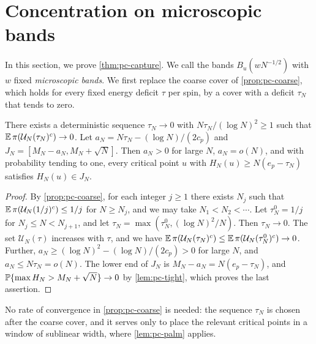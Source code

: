 \section{Concentration on microscopic bands}\label{sec:pc-capture}

In this section, we prove \cref{thm:pc-capture}. We call the bands $B_u(wN^{-1/2})$ with $w$ fixed \emph{microscopic bands}. We first replace the coarse cover of \cref{prop:pc-coarse}, which holds for every fixed energy deficit $\tau$ per spin, by a cover with a deficit $\tau_N$ that tends to zero.

\begin{lemma}\label{lem:pc-diagonal}
There exists a deterministic sequence $\tau_N\to0$ with $N\tau_N/(\log N)^2\ge1$ such that $\mathbb E\,\pi(\mathcal U_N(\tau_N)^c)\to0$. Let $a_N=N\tau_N-(\log N)/(2c_p)$ and $J_N=[M_N-a_N,M_N+\sqrt N]$. Then $a_N>0$ for large $N$, $a_N=o(N)$, and with probability tending to one, every critical point $u$ with $H_N(u)\ge N(e_p-\tau_N)$ satisfies $H_N(u)\in J_N$.
\end{lemma}

\begin{proof}
By \cref{prop:pc-coarse}, for each integer $j\ge1$ there exists $N_j$ such that $\mathbb E\,\pi(\mathcal U_N(1/j)^c)\le1/j$ for $N\ge N_j$, and we may take $N_1<N_2<\cdots$. Let $\tau^0_N=1/j$ for $N_j\le N<N_{j+1}$, and let $\tau_N=\max(\tau^0_N,(\log N)^2/N)$. Then $\tau_N\to0$. The set $\mathcal U_N(\tau)$ increases with $\tau$, and we have $\mathbb E\,\pi(\mathcal U_N(\tau_N)^c)\le\mathbb E\,\pi(\mathcal U_N(\tau^0_N)^c)\to0$. Further, $a_N\ge(\log N)^2-(\log N)/(2c_p)>0$ for large $N$, and $a_N\le N\tau_N=o(N)$. The lower end of $J_N$ is $M_N-a_N=N(e_p-\tau_N)$, and $\mathbb P\{\max H_N>M_N+\sqrt N\}\to0$ by \cref{lem:pc-tight}, which proves the last assertion.
\end{proof}

No rate of convergence in \cref{prop:pc-coarse} is needed: the sequence $\tau_N$ is chosen after the coarse cover, and it serves only to place the relevant critical points in a window of sublinear width, where \cref{lem:pc-palm} applies.


